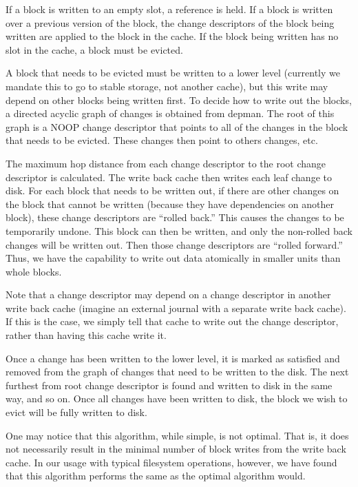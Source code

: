 If a block is written to an empty slot, a reference is held. If a block is
written over a previous version of the block, the change descriptors of the
block being written are applied to the block in the cache. If the block being
written has no slot in the cache, a block must be evicted.

A block that needs to be evicted must be written to a lower level (currently we
mandate this to go to stable storage, not another cache), but this write may
depend on other blocks being written first. To decide how to write out the
blocks, a directed acyclic graph of changes is obtained from depman. The root of
this graph is a NOOP change descriptor that points to all of the changes in the
block that needs to be evicted. These changes then point to others changes, etc.

The maximum hop distance from each change descriptor to the root change
descriptor is calculated. The write back cache then writes each leaf change to
disk. For each block that needs to be written out, if there are other changes on
the block that cannot be written (because they have dependencies on another
block), these change descriptors are ``rolled back.'' This causes the changes to
be temporarily undone. This block can then be written, and only the non-rolled
back changes will be written out. Then those change descriptors are ``rolled
forward.'' Thus, we have the capability to write out data atomically in smaller
units than whole blocks.

Note that a change descriptor may depend on a change descriptor in another write
back cache (imagine an external journal with a separate write back cache). If
this is the case, we simply tell that cache to write out the change descriptor,
rather than having this cache write it.

Once a change has been written to the lower level, it is marked as satisfied and
removed from the graph of changes that need to be written to the disk. The next
furthest from root change descriptor is found and written to disk in the same
way, and so on. Once all changes have been written to disk, the block we wish to
evict will be fully written to disk.

One may notice that this algorithm, while simple, is not optimal. That is, it
does not necessarily result in the minimal number of block writes from the write
back cache. In our usage with typical filesystem operations, however, we have
found that this algorithm performs the same as the optimal algorithm would.

